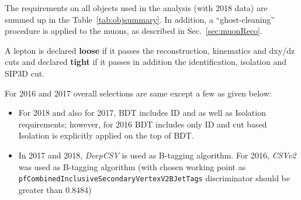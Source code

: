 The requirements on all objects used in the analysis (with 2018 data) are summed up in the Table~\ref{tab:objsummary}. In addition, a ``ghost-cleaning'' procedure is applied to the muons, as described in Sec.~\ref{sec:muonReco}. 

A lepton is declared {\bf loose} if it passes the reconstruction, kinematics and dxy/dz cuts and declared {\bf tight} if it passes in addition the identification, isolation and SIP3D cut. 

For 2016 and 2017 overall selections are same except a few as given below:   

\begin{itemize}    \label{differences}
	\item For 2018 and also for 2017, BDT includes ID and as well as Isolation requirements; however, for 2016 BDT includes only ID and cut based Isolation is explicitly applied on the top of BDT.
	\item In 2017 and 2018, \emph{DeepCSV} is used as B-tagging algorithm. For 2016, \emph{CSVv2} was used as B-tagging algorithm (with chosen working point as \\ \verb=pfCombinedInclusiveSecondaryVertexV2BJetTags= discriminator should be greater than 0.8484) %


\end{itemize}
